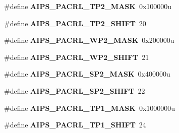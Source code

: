 \begin{DoxyCompactItemize}
\item 
\hypertarget{group___a_i_p_s___register___masks_ga6d4d737074b8d13902a1ab378abcf333}{}\#define {\bfseries A\+I\+P\+S\+\_\+\+P\+A\+C\+R\+L\+\_\+\+T\+P2\+\_\+\+M\+A\+S\+K}~0x100000u\label{group___a_i_p_s___register___masks_ga6d4d737074b8d13902a1ab378abcf333}

\item 
\hypertarget{group___a_i_p_s___register___masks_ga0e7564f6e9b319f465b33bb9ae7a7039}{}\#define {\bfseries A\+I\+P\+S\+\_\+\+P\+A\+C\+R\+L\+\_\+\+T\+P2\+\_\+\+S\+H\+I\+F\+T}~20\label{group___a_i_p_s___register___masks_ga0e7564f6e9b319f465b33bb9ae7a7039}

\item 
\hypertarget{group___a_i_p_s___register___masks_gab01249dcc888add36ffb568f86b6e749}{}\#define {\bfseries A\+I\+P\+S\+\_\+\+P\+A\+C\+R\+L\+\_\+\+W\+P2\+\_\+\+M\+A\+S\+K}~0x200000u\label{group___a_i_p_s___register___masks_gab01249dcc888add36ffb568f86b6e749}

\item 
\hypertarget{group___a_i_p_s___register___masks_ga622a1ec673e76d5e59a9011abfd02b9d}{}\#define {\bfseries A\+I\+P\+S\+\_\+\+P\+A\+C\+R\+L\+\_\+\+W\+P2\+\_\+\+S\+H\+I\+F\+T}~21\label{group___a_i_p_s___register___masks_ga622a1ec673e76d5e59a9011abfd02b9d}

\item 
\hypertarget{group___a_i_p_s___register___masks_gab8610002128f107ec5adcab92fc9f31f}{}\#define {\bfseries A\+I\+P\+S\+\_\+\+P\+A\+C\+R\+L\+\_\+\+S\+P2\+\_\+\+M\+A\+S\+K}~0x400000u\label{group___a_i_p_s___register___masks_gab8610002128f107ec5adcab92fc9f31f}

\item 
\hypertarget{group___a_i_p_s___register___masks_gabe98bf55d378e6b71692ea6b6b890865}{}\#define {\bfseries A\+I\+P\+S\+\_\+\+P\+A\+C\+R\+L\+\_\+\+S\+P2\+\_\+\+S\+H\+I\+F\+T}~22\label{group___a_i_p_s___register___masks_gabe98bf55d378e6b71692ea6b6b890865}

\item 
\hypertarget{group___a_i_p_s___register___masks_ga803c07007800a44bc6af77934bb17be7}{}\#define {\bfseries A\+I\+P\+S\+\_\+\+P\+A\+C\+R\+L\+\_\+\+T\+P1\+\_\+\+M\+A\+S\+K}~0x1000000u\label{group___a_i_p_s___register___masks_ga803c07007800a44bc6af77934bb17be7}

\item 
\hypertarget{group___a_i_p_s___register___masks_gafff2f69445a04798fc4c11e9e5e4f160}{}\#define {\bfseries A\+I\+P\+S\+\_\+\+P\+A\+C\+R\+L\+\_\+\+T\+P1\+\_\+\+S\+H\+I\+F\+T}~24\label{group___a_i_p_s___register___masks_gafff2f69445a04798fc4c11e9e5e4f160}


\end{DoxyCompactItemize}
